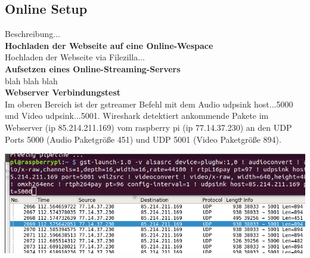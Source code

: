 \subsection{Online Setup}
Beschreibung...\\

\textbf{Hochladen der Webseite auf eine Online-Wespace}\\

Hochladen der Webseite via Filezilla...\\

\textbf{Aufsetzen eines Online-Streaming-Servers}\\
blah blah blah\\

\textbf{Webserver Verbindungstest}\\
Im oberen Bereich ist der gstreamer Befehl mit dem Audio udpsink host...5000 und Video udpsink...5001. Wireshark detektiert ankommende Pakete im Webserver (ip 85.214.211.169) vom raspberry pi (ip 77.14.37.230) an den UDP Ports 5000 (Audio Paketgröße 451) und UDP 5001 (Video Paketgröße 894).\\

\begin{minipage}{\textwidth}
    \begin{center}
        \includegraphics[scale=0.85]{img/wireshark.png} 
    \end{center}
\end{minipage}
